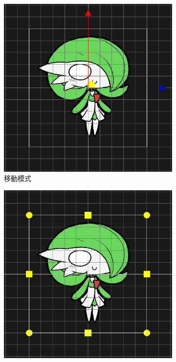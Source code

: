 \begin{figure}[h]
    \begin{center}
    \begin{subfigure}[h]{0.24\linewidth}
        \includegraphics[width=\linewidth]{./resources/editor/gizmo_a.png} 
        \caption{移動模式}
    \end{subfigure}
    \begin{subfigure}[h]{0.24\linewidth}
        \includegraphics[width=\linewidth]{./resources/editor/gizmo_b.png}

\end{subfigure}
\end{center}
\end{figure}
